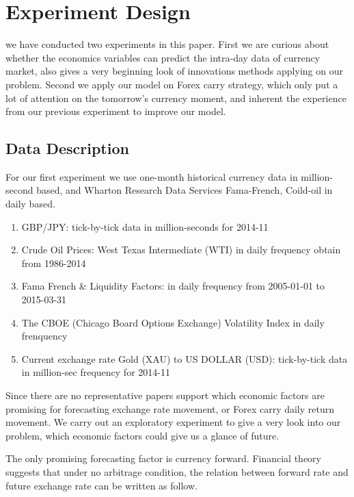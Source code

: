 \chapter{Experiment Design}

    we have conducted two experiments in this paper. First we are curious about whether the economics variables can predict the intra-day data of currency market, also gives a very beginning look of innovations methods applying on our problem.
    Second we apply our model on Forex carry strategy, which only put a lot of attention on the tomorrow's currency moment, and inherent the experience from our previous experiment to improve our model.


\section{Data Description}

For our first experiment we use one-month historical currency data in million-second based, and Wharton Research Data Services Fama-French, Coild-oil in daily based.

\begin{enumerate}
\item{GBP/JPY: tick-by-tick data in million-seconds for 2014-11}
\item{Crude Oil Prices: West Texas Intermediate (WTI) in daily frequency obtain from 1986-2014}
\item{Fama French \& Liquidity Factors: in daily frequency
from 2005-01-01 to 2015-03-31}
\item{The CBOE (Chicago Board Options Exchange) Volatility Index in daily frenquency}
\item{Current exchange rate Gold (XAU) to US DOLLAR (USD): tick-by-tick data in million-sec frequency for 2014-11}
\end{enumerate}
\newpage

    Since there are no representative papers support which economic factors are promising for forecasting exchange rate movement, or Forex carry daily return movement. We carry out an exploratory experiment to give a very look into our problem, which economic factors could give us a glance of future.
    
    
    The only promising forecasting factor is currency forward. Financial theory suggests that under no arbitrage condition, the relation between forward rate and future exchange rate can be written as follow.

